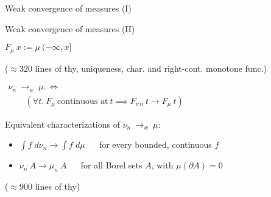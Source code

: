 \documentclass[usepdftitle=false]{beamer}
\begin{document}
\begin{frame}{Weak convergence of measures (I)}
\begin{center}
\end{center}

\end{frame}

\begin{frame}{Weak convergence of measures (II)} %

\begin{definition}%
\vspace{-2ex}
\begin{center}%
$ F_\mu~x := \mu~(-\infty, x] $
\end{center}
{($\approx 320$ lines of thy, uniqueness, char. and right-cont. monotone func.)}
\end{definition}

\pause

\begin{definition}
\vspace{-2ex}
\begin{center} 
$ \begin{array}{l} \nu_n ~{\longrightarrow}_w~ \mu :\Leftrightarrow \\
\qquad
  (\forall t.~ F_\mu~\text{continuous at}~ t \implies
       F_{\nu\,n}~t \longrightarrow F_\mu~t)
  \end{array} $
\end{center}
\end{definition}

\pause

\begin{theorem}
Equivalent characterizations of $\nu_n ~{\longrightarrow}_w~ \mu$:
\begin{itemize}
 \item $\int f \; d\nu_n \longrightarrow \int f \; d\mu$ ~~ for every bounded, continuous $f$
 \item $\nu_n~A \longrightarrow \mu_n~A$ ~~ for all Borel sets $A$, with $\mu(\partial A) = 0$
\end{itemize}
\end{theorem}

($\approx 900$ lines of thy)

\end{frame} %
\end{document}
